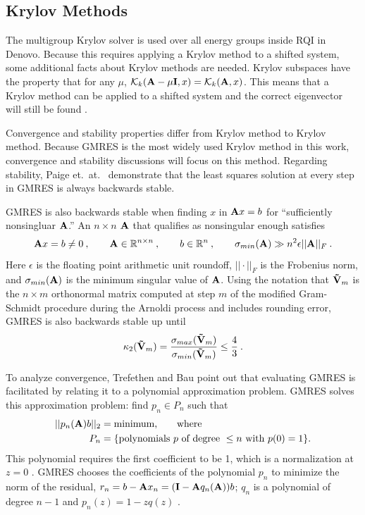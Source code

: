 \subsection{Krylov Methods}
The multigroup Krylov solver is used over all energy groups inside RQI in Denovo. Because this requires applying a Krylov method to a shifted system, some additional facts about Krylov methods are needed. Krylov subspaces have the property that for any $\mu$, $\mathcal{K}_k(\mathbf{A}- \mu \mathbf{I}, x) = \mathcal{K}_k(\mathbf{A},x)$. This means that a Krylov method can be applied to a shifted system and the correct eigenvector will still be found \cite{Stewart2001}. 

Convergence and stability properties differ from Krylov method to Krylov method. Because GMRES is the most widely used Krylov method in this work, convergence and stability discussions will focus on this method. Regarding stability, Paige et.\ at.\  \cite{Paige2006} demonstrate that the least squares solution at every step in GMRES is always backwards stable. 

GMRES is also backwards stable when finding $x$ in $\mathbf{A}x = b$ for ``sufficiently nonsingluar $\mathbf{A}$.'' An $n \times n$ $\mathbf{A}$ that qualifies as nonsingular enough satisfies
%
\begin{equation}
  \mathbf{A}x = b \ne 0\:, \qquad \mathbf{A} \in \mathbb{R}^{n \times n} \:, \qquad b\in \mathbb{R}^{n} \:, \qquad \sigma_{min}(\mathbf{A}) \gg n^{2}\epsilon ||\mathbf{A}||_{F} \:.
\end{equation}
%
Here $\epsilon$ is the floating point arithmetic unit roundoff, $|| \cdot ||_{F}$ is the Frobenius norm, and $\sigma_{min}(\mathbf{A})$ is the minimum singular value of $\mathbf{A}$. Using the notation that $\mathbf{\tilde V}_{m}$ is the $n \times m$ orthonormal matrix computed at step $m$ of the modified Gram-Schmidt procedure during the Arnoldi process and includes rounding error, GMRES is also backwards stable up until  \cite{Paige2006}
%
\begin{equation}
  \kappa_{2}(\mathbf{\tilde V}_{m}) = \frac{\sigma_{max}(\mathbf{\tilde V}_{m})}{\sigma_{min}(\mathbf{\tilde V}_{m})} \le \frac{4}{3} \:.
\end{equation}

To analyze convergence, Trefethen and Bau \cite{Trefethen1997} point out that evaluating GMRES is facilitated by relating it to a polynomial approximation problem. GMRES solves this approximation problem: find $p_{n} \in P_{n}$ such that 
%
\begin{align}
  ||p_{n}(\mathbf{A})b||_{2} &= \text{minimum,} \qquad \text{where}  \nonumber \\
  P_{n} &= \{ \text{polynomials } p \text{ of degree } \le n \text{ with } p(0)=1 \nonumber \}.
\end{align}
%
This polynomial requires the first coefficient to be 1, which is a normalization at $z=0$ . GMRES chooses the coefficients of the polynomial $p_{n}$ to minimize the norm of the residual, $r_{n} = b - \mathbf{A}x_{n} = (\mathbf{I} - \mathbf{A}q_{n} (\mathbf{A}) )b$; $q_{n}$ is a polynomial of degree $n-1$ and $p_{n}(z) = 1 - zq(z)$ \cite{Trefethen1997}.

